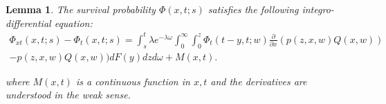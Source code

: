 \documentclass[11pt,reqno]{article}
\newtheorem{lemma}[theorem]{Lemma}
\theoremstyle{definition}
\begin{document}
\begin{lemma} \label{prop_int}
	The survival probability $\Phi(x,t;s)$ satisfies the following integro-differential equation:
	\begin{eqnarray} \label{integro_1}
	 \Phi_{xt}(x, t;s)-\Phi_{t} ( x, t;s)  
	=\int_{s}^{t} \lambda e^{-\lambda \omega} \int_{0}^{\infty} \int_{0}^{z} \Phi_{t}(t-y, t; w) \frac{\partial}{\partial x}(p(z, x, w) Q(x, w)) \nonumber \\
		-p(z, x, w) Q(x, w)) dF(y)dzd\omega +M(x,t).
\end{eqnarray}
	
	where $M(x,t)$ is a continuous function in $x,t$ and the derivatives are understood in the weak sense.
\end{lemma}
\end{document}
